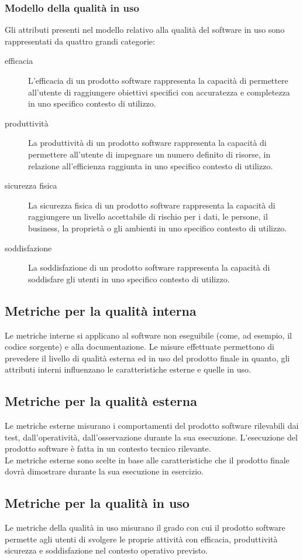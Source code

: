 		\subsubsection{Modello della qualità in uso}
			Gli attributi presenti nel modello relativo alla qualità del software in uso sono rappresentati da quattro grandi categorie:
			\begin{description}
				\item[efficacia] L'efficacia di un prodotto software rappresenta la capacità di permettere all'utente di raggiungere obiettivi specifici con accuratezza e completezza in uno specifico contesto di utilizzo.
				\item[produttività] La produttività di un prodotto software rappresenta la capacità di permettere all'utente di impegnare un numero definito di risorse, in relazione all'efficienza raggiunta in uno specifico contesto di utilizzo.
				\item[sicurezza fisica] La sicurezza fisica di un prodotto software rappresenta la capacità di raggiungere un livello accettabile di rischio per i dati, le persone, il business, la proprietà o gli ambienti in uno specifico contesto di utilizzo.
				\item[soddisfazione] La soddisfazione di un prodotto software rappresenta la capacità di soddisfare gli utenti in uno specifico contesto di utilizzo.
			\end{description}
	\subsection{Metriche per la qualità interna}
		Le metriche interne si applicano al software non eseguibile (come, ad esempio, il codice sorgente) e alla documentazione. Le misure effettuate permettono di prevedere il livello di qualità esterna ed in uso del prodotto finale in quanto, gli attributi interni influenzano le caratteristiche esterne e quelle in uso.
	\subsection{Metriche per la qualità esterna}
		Le metriche esterne misurano i comportamenti del prodotto software rilevabili dai test, dall'operatività, dall'osservazione durante la sua esecuzione. L'esecuzione del prodotto software è fatta in un contesto tecnico rilevante.\\
		Le metriche esterne sono scelte in base alle caratteristiche che il prodotto finale dovrà dimostrare durante la sua esecuzione in esercizio.
	\subsection{Metriche per la qualità in uso}
		Le metriche della qualità in uso misurano il grado con cui il prodotto software permette agli utenti di svolgere le proprie attività con efficacia, produttività sicurezza e soddisfazione nel contesto operativo previsto.
